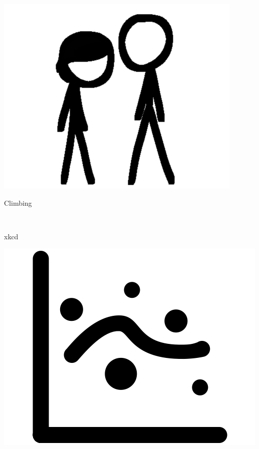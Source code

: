 \documentclass[12pt]{resume}
\begin{document}
\begin{minipage}[t]{0.48\textwidth}
\begin{minipage}[t]{0.1\textwidth}
        {\par \includegraphics[scale=.15]{xkcd}}
    \end{minipage}
    \begin{minipage}[t]{0.38\textwidth}
        {\par \large Climbing}\\
        {\par \large xkcd}
    \end{minipage}
    \begin{minipage}[t]{0.1\textwidth}
        {\par \includegraphics[scale=.038]{math}}\\

\end{minipage}
\end{minipage}
\end{document}
